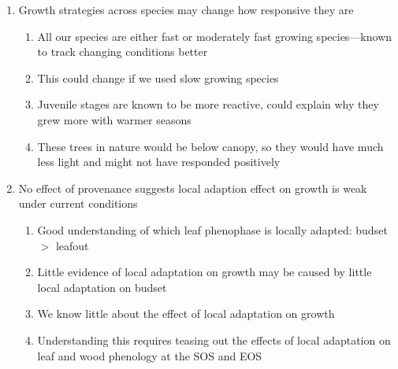 \begin{enumerate}
\begin{enumerate}
\begin{enumerate}
    \item {\Ainc} grow more with GSL and earlier SOS: most growth happens in spring
    
    \item {\Ainc} is ruderal, takes advantage of cool and short days in spring
    
    \item Contrary, {\Bpap} and {\Bpop} driven by EOS: more reactive to warmer, late season temperature
    
    \item {\Ball} SOS and EOS trends counterinteract = no response to GSL
    
    \end{enumerate}
  
  \item Growth strategies across species may change how responsive they are
    \begin{enumerate}
    \item All our species are either fast or moderately fast growing species---known to track changing conditions better
    
    \item This could change if we used slow growing species
    
    \item Juvenile stages are known to be more reactive, could explain why they grew more with warmer seasons
    
    \item These trees in nature would be below canopy, so they would have much less light and might not have responded positively
    \end{enumerate}
  
  \item No effect of provenance suggests local adaption effect on growth is weak under current conditions
    \begin{enumerate}
    \item Good understanding of which leaf phenophase is locally adapted: budset $>$ leafout
    
    \item Little evidence of local adaptation on growth may be caused by little local adaptation on budset
    
    \item We know little about the effect of local adaptation on growth
    
    \item Understanding this requires teasing out the effects of local adaptation on leaf and wood phenology at the SOS and EOS
    \end{enumerate}
  \end{enumerate}


\end{enumerate}
